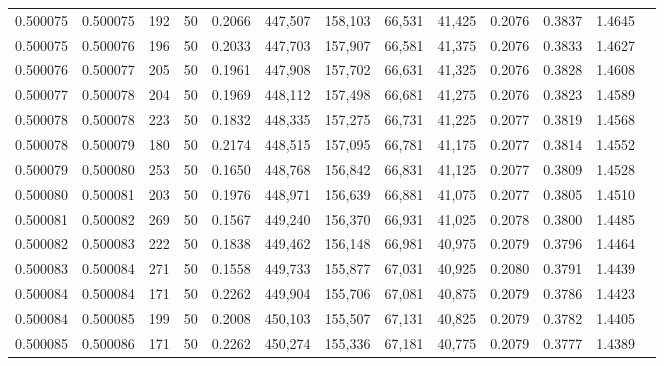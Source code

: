 \begin{tabular}{rrrrrrrrrrrrr}
0.500075 & 0.500075 & 192 &  50 &                                     0.2066 & 447,507 & 158,103 &  66,531 &  41,425 & 0.2076 & 0.3837 & 1.4645 \\
0.500075 & 0.500076 & 196 &  50 &                                     0.2033 & 447,703 & 157,907 &  66,581 &  41,375 & 0.2076 & 0.3833 & 1.4627 \\
0.500076 & 0.500077 & 205 &  50 &                                     0.1961 & 447,908 & 157,702 &  66,631 &  41,325 & 0.2076 & 0.3828 & 1.4608 \\
0.500077 & 0.500078 & 204 &  50 &                                     0.1969 & 448,112 & 157,498 &  66,681 &  41,275 & 0.2076 & 0.3823 & 1.4589 \\
0.500078 & 0.500078 & 223 &  50 &                                     0.1832 & 448,335 & 157,275 &  66,731 &  41,225 & 0.2077 & 0.3819 & 1.4568 \\
0.500078 & 0.500079 & 180 &  50 &                                     0.2174 & 448,515 & 157,095 &  66,781 &  41,175 & 0.2077 & 0.3814 & 1.4552 \\
0.500079 & 0.500080 & 253 &  50 &                                     0.1650 & 448,768 & 156,842 &  66,831 &  41,125 & 0.2077 & 0.3809 & 1.4528 \\
0.500080 & 0.500081 & 203 &  50 &                                     0.1976 & 448,971 & 156,639 &  66,881 &  41,075 & 0.2077 & 0.3805 & 1.4510 \\
0.500081 & 0.500082 & 269 &  50 &                                     0.1567 & 449,240 & 156,370 &  66,931 &  41,025 & 0.2078 & 0.3800 & 1.4485 \\
0.500082 & 0.500083 & 222 &  50 &                                     0.1838 & 449,462 & 156,148 &  66,981 &  40,975 & 0.2079 & 0.3796 & 1.4464 \\
0.500083 & 0.500084 & 271 &  50 &                                     0.1558 & 449,733 & 155,877 &  67,031 &  40,925 & 0.2080 & 0.3791 & 1.4439 \\
0.500084 & 0.500084 & 171 &  50 &                                     0.2262 & 449,904 & 155,706 &  67,081 &  40,875 & 0.2079 & 0.3786 & 1.4423 \\
0.500084 & 0.500085 & 199 &  50 &                                     0.2008 & 450,103 & 155,507 &  67,131 &  40,825 & 0.2079 & 0.3782 & 1.4405 \\
0.500085 & 0.500086 & 171 &  50 &                                     0.2262 & 450,274 & 155,336 &  67,181 &  40,775 & 0.2079 & 0.3777 & 1.4389 \\

\end{tabular}
